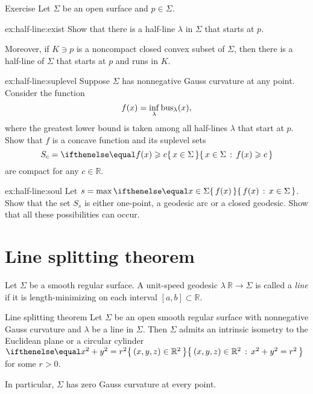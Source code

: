 \begin{thm}{Exercise}\label{ex:half-line}
Let $\Sigma$ be an open surface and $p\in\Sigma$.

\begin{subthm}{ex:half-line:exist}
Show that there is a half-line $\lambda$ in $\Sigma$ that starts at $p$.

Moreover, if $K\ni p$ is a noncompact closed convex subset of $\Sigma$, then there is a half-line of $\Sigma$ that starts at $p$ and runs in $K$.
\end{subthm}

\begin{subthm}{ex:half-line:suplevel}
Suppose $\Sigma$ has nonnegative Gauss curvature at any point.
Consider the function
\[f(x)=\inf_\lambda\mathop{\rm bus}\nolimits_\lambda(x),\]
where the greatest lower bound is taken among all half-lines $\lambda$ that start at $p$.
Show that $f$ is a concave function and its suplevel sets 
\[S_c=\set{x\in\Sigma}{f(x)\ge c}\] 
are compact for any $c\in\mathbb{R}$.
\end{subthm}

\begin{subthm}{ex:half-line:soul}
Let $s=\max\set{f(x)}{x\in\Sigma}$.
Show that the set $S_s$ is either one-point, a geodesic arc or a closed geodesic.
Show that all these possibilities can occur.
\end{subthm}



\end{thm}

\section{Line splitting theorem}

Let $\Sigma$ be a smooth regular surface.
A unit-speed geodesic $\lambda\:\mathbb{R}\to\Sigma$ is called a \emph{line} if it is length-minimizing on each interval $[a,b]\subset \mathbb{R}$.

\begin{thm}{Line splitting theorem}\label{thm:splitting}
Let $\Sigma$  be an open smooth regular surface with nonnegative Gauss curvature
and $\lambda$ be a line in $\Sigma$. 
Then $\Sigma$ admits an intrinsic isometry to the Euclidean plane or a circular cylinder $\set{(x,y,z)\in \mathbb{R}^2}{x^2+y^2=r^2}$ for some $r>0$.

In particular, $\Sigma$ has zero Gauss curvature at every point.
\end{thm}


